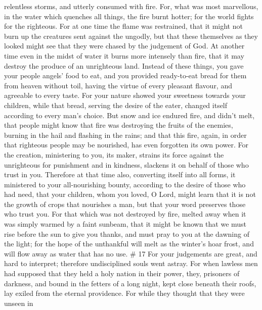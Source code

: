 relentless storms, and utterly consumed with fire.  For,
what was most marvellous, in the water which quenches all things, the
fire burnt hotter; for the world fights for the righteous. 
For at one time the flame was restrained, that it might not burn up the
creatures sent against the ungodly, but that these themselves as they
looked might see that they were chased by the judgement of God.
 At another time even in the midst of water it burns more
intensely than fire, that it may destroy the produce of an unrighteous
land.  Instead of these things, you gave your people
angels' food to eat, and you provided ready-to-eat bread for them from
heaven without toil, having the virtue of every pleasant flavour, and
agreeable to every taste.  For your nature showed your
sweetness towards your children, while that bread, serving the desire of
the eater, changed itself according to every man's choice. 
But snow and ice endured fire, and didn't melt, that people might know
that fire was destroying the fruits of the enemies, burning in the hail
and flashing in the rains;  and that this fire, again, in
order that righteous people may be nourished, has even forgotten its own
power.  For the creation, ministering to you, its maker,
strains its force against the unrighteous for punishment and in
kindness, slackens it on behalf of those who trust in you. 
Therefore at that time also, converting itself into all forms, it
ministered to your all-nourishing bounty, according to the desire of
those who had need,  that your children, whom you loved, O
Lord, might learn that it is not the growth of crops that nourishes a
man, but that your word preserves those who trust you.  For
that which was not destroyed by fire, melted away when it was simply
warmed by a faint sunbeam,  that it might be known that we
must rise before the sun to give you thanks, and must pray to you at the
dawning of the light;  for the hope of the unthankful will
melt as the winter's hoar frost, and will flow away as water that has no
use. \# 17  For your judgements are great, and hard to
interpret; therefore undisciplined souls went astray.  For
when lawless men had supposed that they held a holy nation in their
power, they, prisoners of darkness, and bound in the fetters of a long
night, kept close beneath their roofs, lay exiled from the eternal
providence.  For while they thought that they were unseen in
